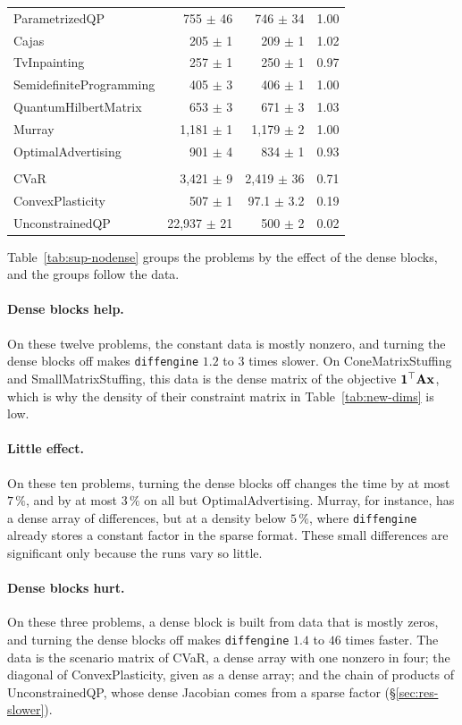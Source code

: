\documentclass[letterpaper,12pt]{article}
\begin{document}
\begin{table}[htbp]
{\begin{tabular}{l rr l}
ParametrizedQP & 755 $\pm$ 46 & 746 $\pm$ 34 & 1.00 \\
Cajas & 205 $\pm$ 1 & 209 $\pm$ 1 & 1.02 \\
TvInpainting & 257 $\pm$ 1 & 250 $\pm$ 1 & 0.97 \\
SemidefiniteProgramming & 405 $\pm$ 3 & 406 $\pm$ 1 & 1.00 \\
QuantumHilbertMatrix & 653 $\pm$ 3 & 671 $\pm$ 3 & 1.03 \\
Murray & 1{,}181 $\pm$ 1 & 1{,}179 $\pm$ 2 & 1.00 \\
OptimalAdvertising & 901 $\pm$ 4 & 834 $\pm$ 1 & 0.93 \\
\addlinespace
\multicolumn{4}{l}{\textit{Dense blocks hurt}} \\
CVaR & 3{,}421 $\pm$ 9 & 2{,}419 $\pm$ 36 & 0.71 \\
ConvexPlasticity & 507 $\pm$ 1 & 97.1 $\pm$ 3.2 & 0.19 \\
UnconstrainedQP & 22{,}937 $\pm$ 21 & 500 $\pm$ 2 & 0.02 \\
\bottomrule
\end{tabular}}
\end{table}

Table~\ref{tab:sup-nodense} groups the problems by the effect of the dense blocks, and the
groups follow the data.

\paragraph{Dense blocks help.} On these twelve problems, the constant data is mostly nonzero, and
turning the dense blocks off makes \texttt{diffengine} $1.2$ to $3$ times slower. On
ConeMatrixStuffing and SmallMatrixStuffing, this data is the dense matrix of the objective
$\mathbf 1^\top \mathbf{A} \mathbf{x}$, which is why the density of their constraint matrix in
Table~\ref{tab:new-dims} is low.

\paragraph{Little effect.} On these ten problems, turning the dense blocks off changes the time by
at most $7\,\%$, and by at most $3\,\%$ on all but OptimalAdvertising. Murray, for instance, has
a dense array of differences, but at a density below $5\,\%$, where \texttt{diffengine} already
stores a constant factor in the sparse format. These small differences are significant only
because the runs vary so little.

\paragraph{Dense blocks hurt.} On these three problems, a dense block is built from data that is
mostly zeros, and turning the dense blocks off makes \texttt{diffengine} $1.4$ to $46$ times
faster. The data is the scenario matrix of CVaR, a dense array with one nonzero in four; the
diagonal of ConvexPlasticity, given as a dense array; and the chain of products of
UnconstrainedQP, whose dense Jacobian comes from a sparse factor (\S\ref{sec:res-slower}).
\end{document}
